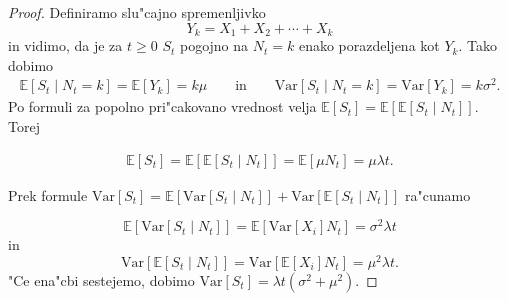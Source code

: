 \documentclass[12pt, a4paper, reqno]{amsart}
\theoremstyle{definition}
\theoremstyle{plain}
\newcommand{\E}{\mathbb{E}}
\newcommand{\1}{\mathds{1}}
\newcommand{\Var}[1]{\text{Var}\left[#1\right]}
\begin{document}
        \begin{proof}

            Definiramo slu"cajno spremenljivko
            \begin{equation}
                Y_k = X_1 + X_2 + \cdots + X_k
                \label{eq:Y_k}
            \end{equation}
            in vidimo, da je za $t\geq0$ $S_t$ pogojno na $N_t = k$ enako porazdeljena 
            kot $Y_k$. Tako dobimo 
            \begin{align*}
            \E\left[S_t\mid N_t = k\right] = \E\left[Y_k\right] = k\mu \qquad \text{in} \qquad
            \Var{S_t\mid N_t = k} = \Var{Y_k} = k\sigma^2.
            \end{align*}
            Po formuli za popolno pri"cakovano vrednost velja 
            $\E\left[S_t\right] = \E\left[\E\left[S_t\mid N_t\right]\right]$. Torej

            \begin{align*}
                \E\left[S_t\right] = \E\left[\E\left[S_t\mid N_t\right]\right] = \E\left[\mu N_t\right] = \mu\lambda t.
            \end{align*}

            \noindent
            Prek formule $\Var{S_t} = \E\left[\Var{S_t\mid N_t}\right] + \Var{\E\left[S_t\mid N_t\right]}$ ra"cunamo 

            \begin{equation*}
                \E\left[\Var{S_t\mid N_t}\right] = \E\left[\Var{X_i}N_t\right] = \sigma^2\lambda t
            \end{equation*}
            in 
            \begin{equation*}
                \Var{\E\left[S_t\mid N_t\right]} = \Var{\E\left[X_i\right]N_t} = \mu^2\lambda t.
            \end{equation*}
            "Ce ena"cbi sestejemo, dobimo $\Var{S_t} = \lambda t\left(\sigma^2 + \mu^2\right)$.
        \end{proof}
    
\end{document}
